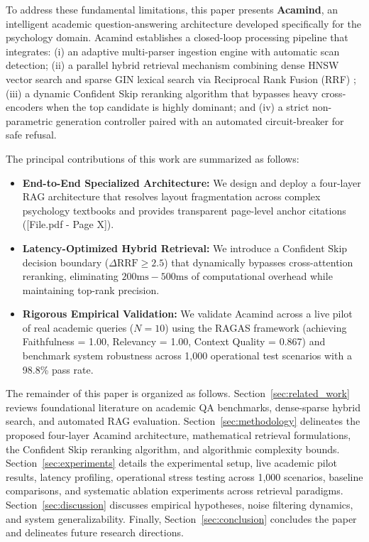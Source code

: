 \documentclass[10pt]{SPIIRAS_Proceedings}
\begin{document}
To address these fundamental limitations, this paper presents \textbf{Acamind}, an intelligent academic question-answering architecture developed specifically for the psychology domain. Acamind establishes a closed-loop processing pipeline that integrates: (i) an adaptive multi-parser ingestion engine with automatic scan detection; (ii) a parallel hybrid retrieval mechanism combining dense HNSW vector search \cite{wang2022text, malkov2020efficient} and sparse GIN lexical search \cite{formal2021splade} via Reciprocal Rank Fusion (RRF) \cite{cormack2009reciprocal}; (iii) a dynamic Confident Skip reranking algorithm that bypasses heavy cross-encoders when the top candidate is highly dominant; and (iv) a strict non-parametric generation controller paired with an automated circuit-breaker for safe refusal.

The principal contributions of this work are summarized as follows:
\begin{itemize}
    \item \textbf{End-to-End Specialized Architecture:} We design and deploy a four-layer RAG architecture that resolves layout fragmentation across complex psychology textbooks and provides transparent page-level anchor citations ([File.pdf - Page X]).
    \item \textbf{Latency-Optimized Hybrid Retrieval:} We introduce a Confident Skip decision boundary ($\Delta \text{RRF} \ge 2.5$) that dynamically bypasses cross-attention reranking, eliminating $200\text{ms}-500\text{ms}$ of computational overhead while maintaining top-rank precision.
    \item \textbf{Rigorous Empirical Validation:} We validate Acamind across a live pilot of real academic queries ($N=10$) using the RAGAS framework (achieving Faithfulness = 1.00, Relevancy = 1.00, Context Quality = 0.867) and benchmark system robustness across 1,000 operational test scenarios with a 98.8\% pass rate.
\end{itemize}

The remainder of this paper is organized as follows. Section~\ref{sec:related_work} reviews foundational literature on academic QA benchmarks, dense-sparse hybrid search, and automated RAG evaluation. Section~\ref{sec:methodology} delineates the proposed four-layer Acamind architecture, mathematical retrieval formulations, the Confident Skip reranking algorithm, and algorithmic complexity bounds. Section~\ref{sec:experiments} details the experimental setup, live academic pilot results, latency profiling, operational stress testing across 1,000 scenarios, baseline comparisons, and systematic ablation experiments across retrieval paradigms. Section~\ref{sec:discussion} discusses empirical hypotheses, noise filtering dynamics, and system generalizability. Finally, Section~\ref{sec:conclusion} concludes the paper and delineates future research directions.
\end{document}
